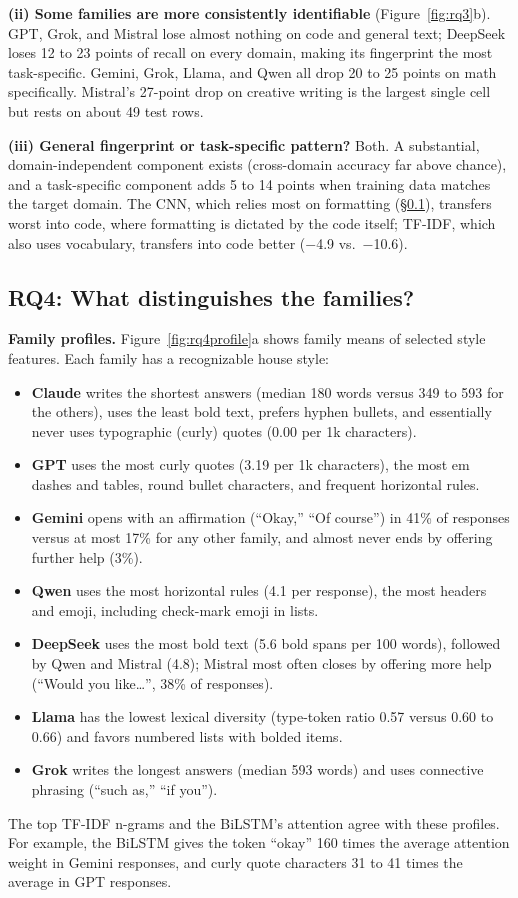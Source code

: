 \documentclass[11pt]{article}
\newcommand{\pct}[1]{#1\%}
\begin{document}
\textbf{(ii) Some families are more consistently identifiable} (Figure~\ref{fig:rq3}b). GPT, Grok, and Mistral lose almost nothing on code and general text; DeepSeek loses 12 to 23 points of recall on every domain, making its fingerprint the most task-specific. Gemini, Grok, Llama, and Qwen all drop 20 to 25 points on math specifically. Mistral's 27-point drop on creative writing is the largest single cell but rests on about 49 test rows.

\textbf{(iii) General fingerprint or task-specific pattern?} Both. A substantial, domain-independent component exists (cross-domain accuracy far above chance), and a task-specific component adds 5 to 14 points when training data matches the target domain. The CNN, which relies most on formatting (\S\ref{sec:rq4}), transfers worst into code, where formatting is dictated by the code itself; TF-IDF, which also uses vocabulary, transfers into code better ($-$4.9 vs.\ $-$10.6).

\subsection{RQ4: What distinguishes the families?}
\label{sec:rq4}
\textbf{Family profiles.} Figure~\ref{fig:rq4profile}a shows family means of selected style features. Each family has a recognizable house style:
\begin{itemize}
  \item \textbf{Claude} writes the shortest answers (median 180 words versus 349 to 593 for the others), uses the least bold text, prefers hyphen bullets, and essentially never uses typographic (curly) quotes (0.00 per 1k characters).
  \item \textbf{GPT} uses the most curly quotes (3.19 per 1k characters), the most em dashes and tables, round bullet characters, and frequent horizontal rules.
  \item \textbf{Gemini} opens with an affirmation (``Okay,'' ``Of course'') in \pct{41} of responses versus at most \pct{17} for any other family, and almost never ends by offering further help (\pct{3}).
  \item \textbf{Qwen} uses the most horizontal rules (4.1 per response), the most headers and emoji, including check-mark emoji in lists.
  \item \textbf{DeepSeek} uses the most bold text (5.6 bold spans per 100 words), followed by Qwen and Mistral (4.8); Mistral most often closes by offering more help (``Would you like\ldots'', \pct{38} of responses).
  \item \textbf{Llama} has the lowest lexical diversity (type-token ratio 0.57 versus 0.60 to 0.66) and favors numbered lists with bolded items.
  \item \textbf{Grok} writes the longest answers (median 593 words) and uses connective phrasing (``such as,'' ``if you'').
\end{itemize}
The top TF-IDF n-grams and the BiLSTM's attention agree with these profiles. For example, the BiLSTM gives the token ``okay'' 160 times the average attention weight in Gemini responses, and curly quote characters 31 to 41 times the average in GPT responses.
\end{document}

